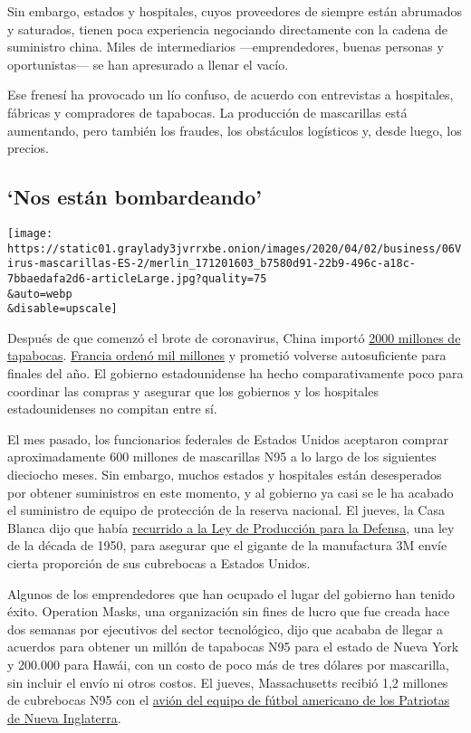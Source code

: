 Sin embargo, estados y hospitales, cuyos proveedores de siempre están
abrumados y saturados, tienen poca experiencia negociando directamente
con la cadena de suministro china. Miles de intermediarios
---emprendedores, buenas personas y oportunistas--- se han apresurado a
llenar el vacío.

Ese frenesí ha provocado un lío confuso, de acuerdo con entrevistas a
hospitales, fábricas y compradores de tapabocas. La producción de
mascarillas está aumentando, pero también los fraudes, los obstáculos
logísticos y, desde luego, los precios.

\hypertarget{nos-estuxe1n-bombardeando}{%
\subsection{`Nos están bombardeando'}\label{nos-estuxe1n-bombardeando}}

\texttt{[image: https://static01.graylady3jvrrxbe.onion/images/2020/04/02/business/06Virus-mascarillas-ES-2/merlin\_171201603\_b7580d91-22b9-496c-a18c-7bbaedafa2d6-articleLarge.jpg?quality=75\\\&auto=webp\\\&disable=upscale]}

Después de que comenzó el brote de coronavirus, China importó
\href{https://www.nytimes3xbfgragh.onion/2020/04/01/business/coronavirus-china-masks.html}{2000
millones de tapabocas}.
\href{https://www.nytimes3xbfgragh.onion/reuters/2020/03/31/world/europe/31reuters-health-coronavirus-france-masks.html}{Francia
ordenó mil millones} y prometió volverse autosuficiente para finales del
año. El gobierno estadounidense ha hecho comparativamente poco para
coordinar las compras y asegurar que los gobiernos y los hospitales
estadounidenses no compitan entre sí.

El mes pasado, los funcionarios federales de Estados Unidos aceptaron
comprar aproximadamente 600 millones de mascarillas N95 a lo largo de
los siguientes dieciocho meses. Sin embargo, muchos estados y hospitales
están desesperados por obtener suministros en este momento, y al
gobierno ya casi se le ha acabado el suministro de equipo de protección
de la reserva nacional. El jueves, la Casa Blanca dijo que había
\href{https://www.nytimes3xbfgragh.onion/2020/04/02/world/coronavirus-live-news-updates.html\#link-711303f6}{recurrido
a la Ley de Producción para la Defensa}, una ley de la década de 1950,
para asegurar que el gigante de la manufactura 3M envíe cierta
proporción de sus cubrebocas a Estados Unidos.

Algunos de los emprendedores que han ocupado el lugar del gobierno han
tenido éxito. Operation Masks, una organización sin fines de lucro que
fue creada hace dos semanas por ejecutivos del sector tecnológico, dijo
que acababa de llegar a acuerdos para obtener un millón de tapabocas N95
para el estado de Nueva York y 200.000 para Hawái, con un costo de poco
más de tres dólares por mascarilla, sin incluir el envío ni otros
costos. El jueves, Massachusetts recibió 1,2 millones de cubrebocas N95
con el
\href{https://www.wsj.com/articles/a-million-n95-masks-are-coming-from-chinaon-board-the-new-england-patriots-plane-11585821600}{avión
del equipo de fútbol americano de los Patriotas de Nueva Inglaterra}.

